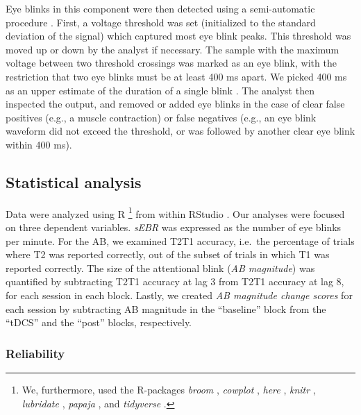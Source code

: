\documentclass[11pt,]{memoir}
\let\rmarkdownfootnote\footnote%
\def\footnote{\protect\rmarkdownfootnote}
\begin{document}
Eye blinks in this component were then detected using a semi-automatic procedure \autocites[cf.][]{Slagter2013}{Kruis2016}. First, a voltage threshold was set (initialized to the standard deviation of the signal) which captured most eye blink peaks. This threshold was moved up or down by the analyst if necessary. The sample with the maximum voltage between two threshold crossings was marked as an eye blink, with the restriction that two eye blinks must be at least 400 ms apart. We picked 400 ms as an upper estimate of the duration of a single blink \autocite{Caffier2003}. The analyst then inspected the output, and removed or added eye blinks in the case of clear false positives (e.g., a muscle contraction) or false negatives (e.g., an eye blink waveform did not exceed the threshold, or was followed by another clear eye blink within 400 ms).

\hypertarget{AB_sEBR-stats}{%
\subsection{Statistical analysis}\label{AB_sEBR-stats}}

Data were analyzed using R \autocite[Version 3.5.1;][]{R-base}\footnote{We, furthermore, used the R-packages \emph{broom} \autocite[Version 0.5.1;][]{R-broom}, \emph{cowplot} \autocite[Version 0.9.99;][]{R-cowplot}, \emph{here} \autocite[Version 0.1;][]{R-here}, \emph{knitr} \autocite[Version 1.21;][]{R-knitr}, \emph{lubridate} \autocite[Version 1.7.4;][]{R-lubridate}, \emph{papaja} \autocite[Version 0.1.0.9842;][]{R-papaja}, and \emph{tidyverse} \autocite[Version 1.2.1;][]{R-tidyverse}.} from within RStudio \autocite[Version 1.1.463;][]{RStudio2016}. Our analyses were focused on three dependent variables. \emph{sEBR} was expressed as the number of eye blinks per minute. For the AB, we examined T2\textbar{}T1 accuracy, i.e.~the percentage of trials where T2 was reported correctly, out of the subset of trials in which T1 was reported correctly. The size of the attentional blink (\emph{AB magnitude}) was quantified by subtracting T2\textbar{}T1 accuracy at lag 3 from T2\textbar{}T1 accuracy at lag 8, for each session in each block. Lastly, we created \emph{AB magnitude change scores} for each session by subtracting AB magnitude in the ``baseline'' block from the ``tDCS'' and the ``post'' blocks, respectively.

\hypertarget{AB_sEBR-methods-rel}{%
\subsubsection{Reliability}\label{AB_sEBR-methods-rel}}
\end{document}
